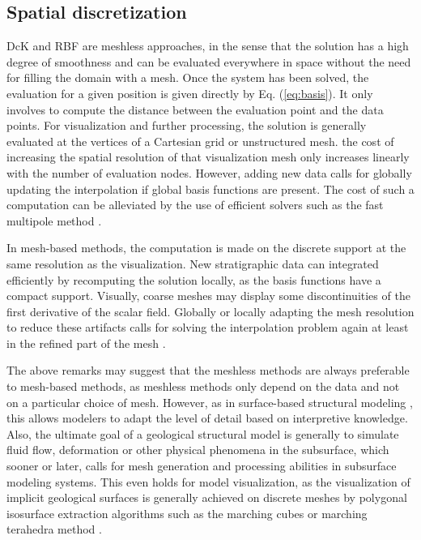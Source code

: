 \documentclass[preprint]{ring20}
\begin{document}
{\subsection{Spatial discretization}

DcK and RBF are meshless approaches, in the sense that the solution has a high degree of smoothness and can be evaluated everywhere in space without the need for filling the domain with a mesh. Once the system has been solved, the evaluation for a given position is given directly by Eq. (\ref{eq:basis}). It only involves to compute the distance between the evaluation point and the data points. For visualization and further processing, the solution is generally evaluated at the vertices of a Cartesian grid or unstructured mesh. the cost of increasing the spatial resolution of that visualization mesh only increases linearly with the number of evaluation nodes. However, adding new data calls for globally updating the interpolation if global basis functions are present. The cost of such a computation can be alleviated by the use of efficient solvers such as the fast multipole method \citep{greengard_fast_1987}. 

In mesh-based methods, the computation is made on the discrete support at the same resolution as the visualization. New stratigraphic data can integrated efficiently by recomputing the solution locally, as the basis functions have a compact support. Visually, coarse meshes may display some discontinuities of the first derivative of the scalar field. Globally or locally adapting the mesh resolution to reduce these artifacts calls for solving the interpolation problem again at least in the refined part of the mesh \citep{Frank2007CG}. 

The above remarks may suggest that the meshless methods are always preferable to mesh-based methods, as meshless methods only depend on the data and not on a particular choice of mesh. However, as in surface-based structural modeling \citep{Caumon2009MG}, this allows modelers to adapt the level of detail based on interpretive knowledge. Also, the ultimate goal of a geological structural model is generally to simulate fluid flow, deformation or other physical phenomena in the subsurface, which sooner or later, calls for mesh generation and processing abilities in subsurface modeling systems. This even holds for model visualization, as the visualization of implicit geological surfaces is generally achieved on discrete meshes by polygonal isosurface extraction algorithms such as the marching cubes \citep{Calcagno2008PEPI} or marching terahedra method \citep{Frank2007CG}. 

}
\end{document}
